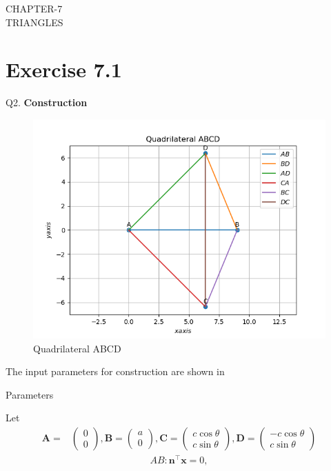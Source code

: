 \documentclass{article}
\newcommand{\myvec}[1]{\ensuremath{\begin{pmatrix}#1\end{pmatrix}}}
\let\vec\mathbf
\begin{document}
\begin{center}
        \textbf\large{CHAPTER-7 \\ TRIANGLES}
\end{center}
\section{Exercise 7.1}
Q2. \textbf{Construction}\\
\fi
\begin{figure}[h!]
	\begin{center}
		\includegraphics[width=\columnwidth]{chapters/9/7/1/2/figs/fig.png}
	\end{center}
	\caption{Quadrilateral ABCD}
	\label{fig:chapters/9/7/1/2/Fig}
\end{figure}
The input parameters for construction are shown in 
\begin{table}[h!]
    \centering
    
    \caption{Parameters}
    \label{tab:chapters/9/7/1/2/Table1}
\end{table}
Let
\begin{align}
\vec{A} =& \myvec{0\\0},\vec{B} = \myvec{a\\0},\vec{C} = \myvec{c\cos\theta\\c\sin\theta},\vec{D} = \myvec{-c\cos\theta\\c\sin\theta}
\end{align}
\begin{align}
	AB: 	\vec{n}^{\top}\vec{x} = 0,\\
\end{align}
\end{document}
